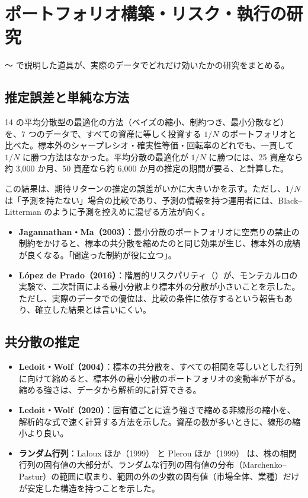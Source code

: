 \chapter{ポートフォリオ構築・リスク・執行の研究}
\label{ch:pcresearch}

〜 で説明した道具が、実際のデータでどれだけ効いたかの研究をまとめる。

\section{推定誤差と単純な方法}

\begin{paperbox}
14 の平均分散型の最適化の方法（ベイズの縮小、制約つき、最小分散など）を、7 つのデータで、すべての資産に等しく投資する $1/N$ のポートフォリオと比べた。標本外のシャープレシオ・確実性等価・回転率のどれでも、一貫して $1/N$ に勝つ方法はなかった。平均分散の最適化が $1/N$ に勝つには、25 資産なら約 3,000 か月、50 資産なら約 6,000 か月の推定の期間が要る、と計算した。
\end{paperbox}

この結果は、期待リターンの推定の誤差がいかに大きいかを示す。ただし、$1/N$ は「予測を持たない」場合の比較であり、予測の情報を持つ運用者には、Black--Litterman のように予測を控えめに混ぜる方法が向く。

\begin{itemize}
\item \textbf{Jagannathan・Ma（2003）}\cite{jagannathanma2003}：最小分散のポートフォリオに空売りの禁止の制約をかけると、標本の共分散を縮めたのと同じ効果が生じ、標本外の成績が良くなる。「間違った制約が役に立つ」。
\item \textbf{López de Prado（2016）}\cite{hrp2016}：階層的リスクパリティ（）が、モンテカルロの実験で、二次計画による最小分散より標本外の分散が小さいことを示した。ただし、実際のデータでの優位は、比較の条件に依存するという報告もあり、確立した結果とは言いにくい。
\end{itemize}

\section{共分散の推定}

\begin{itemize}
\item \textbf{Ledoit・Wolf（2004）}\cite{ledoitwolf2004}：標本の共分散を、すべての相関を等しいとした行列に向けて縮めると、標本外の最小分散のポートフォリオの変動率が下がる。縮める強さは、データから解析的に計算できる。
\item \textbf{Ledoit・Wolf（2020）}\cite{ledoitwolf2020}：固有値ごとに違う強さで縮める非線形の縮小を、解析的な式で速く計算する方法を示した。資産の数が多いときに、線形の縮小より良い。
\item \textbf{ランダム行列}：Laloux ほか（1999）\cite{laloux1999} と Plerou ほか（1999）\cite{plerou1999} は、株の相関行列の固有値の大部分が、ランダムな行列の固有値の分布（Marchenko--Pastur）の範囲に収まり、範囲の外の少数の固有値（市場全体、業種）だけが安定した構造を持つことを示した。
\end{itemize}

